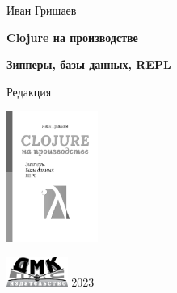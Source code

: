 
\begin{titlepage}

\begin{center}

  {Иван Гришаев}

  \vspace*{5cm}

  {\Large\textbf{Clojure на производстве}}

  \vspace{1mm}

  {\Large\textbf{Зипперы, базы данных, REPL}}

  \vspace{7mm}

  {\small Редакция \COMMITHASH}

  \ifdmk
  \else
    \vspace{3mm}
    \includegraphics[width=30mm]{media/art_bw}%
  \fi

  \vspace*{\fill}

  \ifdmk
    \includegraphics[width=20mm]{media/dmk_logo}%
  \else
    {2023}
  \fi

\end{center}

\end{titlepage}
